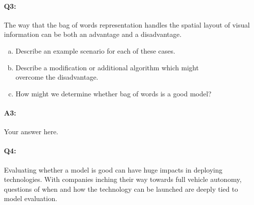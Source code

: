 






\pagebreak
\paragraph{Q3:} The way that the bag of words representation handles the spatial layout of visual information can be both an advantage and a disadvantage.
\begin{enumerate}[(a)]
\item Describe an example scenario for each of these cases.
\item Describe a modification or additional algorithm which might\\overcome the disadvantage.

\item How might we determine whether bag of words is a good model?
\end{enumerate}
\paragraph{A3:} Your answer here.










\pagebreak
\paragraph{Q4:}
Evaluating whether a model is good can have huge impacts in deploying technologies. With companies inching their way towards full vehicle autonomy, questions of when and how the technology can be launched are deeply tied to model evaluation. 

